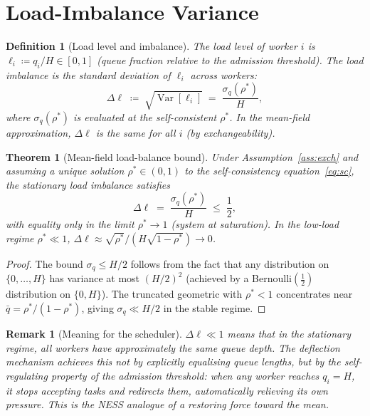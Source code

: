 \documentclass[11pt,a4paper]{report}
\newtheorem{theorem}{Theorem}[section]
\newtheorem{definition}{Definition}[section]
\newtheorem{remark}{Remark}[section]
\newcommand{\Var}[1]{\operatorname{Var}\!\left[#1\right]}
\begin{document}
\section{Load-Imbalance Variance}

\begin{definition}[Load level and imbalance]
\label{def:imbalance}
The \emph{load level} of worker $i$ is $\ell_i \coloneqq q_i / H
\in [0,1]$ (queue fraction relative to the admission threshold).
The \emph{load imbalance} is the standard deviation of $\ell_i$
across workers:
\[
  \Delta\ell \;\coloneqq\; \sqrt{\Var{\ell_i}}
             \;=\; \frac{\sigma_q(\rho^*)}{H},
\]
where $\sigma_q(\rho^*)$ is evaluated at the self-consistent
$\rho^*$.  In the mean-field approximation, $\Delta\ell$ is the
same for all $i$ (by exchangeability).
\end{definition}

\begin{theorem}[Mean-field load-balance bound]
\label{thm:lb}
Under Assumption~\ref{ass:exch} and assuming a unique solution
$\rho^* \in (0,1)$ to the self-consistency equation~\eqref{eq:sc},
the stationary load imbalance satisfies
\[
  \Delta\ell \;=\; \frac{\sigma_q(\rho^*)}{H}
  \;\leq\; \frac{1}{2},
\]
with equality only in the limit $\rho^* \to 1$ (system at
saturation).  In the low-load regime $\rho^* \ll 1$,
$\Delta\ell \approx \sqrt{\rho^*}/(H\sqrt{1-\rho^*}) \to 0$.
\end{theorem}

\begin{proof}
The bound $\sigma_q \leq H/2$ follows from the fact that any
distribution on $\{0,\ldots,H\}$ has variance at most $(H/2)^2$
(achieved by a Bernoulli$(\frac{1}{2})$ distribution on $\{0,H\}$).
The truncated geometric with $\rho^* < 1$ concentrates near
$\bar{q} = \rho^*/(1-\rho^*)$, giving $\sigma_q \ll H/2$ in
the stable regime.
\end{proof}

\begin{remark}[Meaning for the scheduler]
$\Delta\ell \ll 1$ means that in the stationary regime, all workers
have approximately the same queue depth.  The deflection mechanism
achieves this not by explicitly equalising queue lengths, but by
the \emph{self-regulating} property of the admission threshold:
when any worker reaches $q_i = H$, it stops accepting tasks and
redirects them, automatically relieving its own pressure.
This is the NESS analogue of a restoring force toward the mean.
\end{remark}
\end{document}
